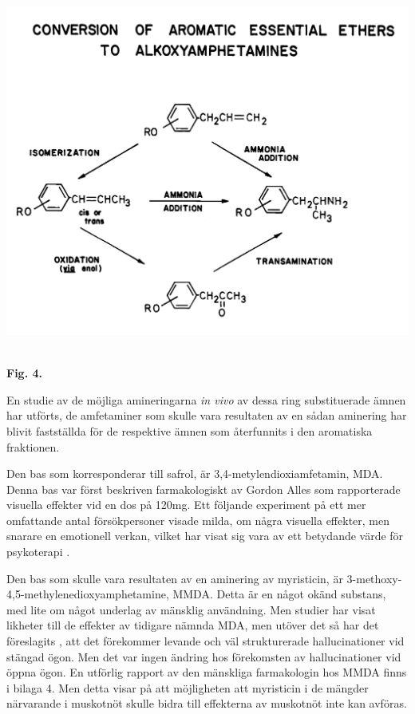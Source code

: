 \documentclass{theme/franska}
\begin{document}
{	\hbox{\hspace{1cm}\includegraphics[scale=0.115]{Figure4}
	}
	\begin{center}\textbf{Fig. 4.}\end{center}


	En studie av de möjliga amineringarna \textit{in vivo} av dessa ring substituerade
	ämnen har utförts, de amfetaminer som skulle vara resultaten av en sådan
	aminering har blivit fastställda för de respektive ämnen som återfunnits
	i den aromatiska fraktionen.

	Den bas som korresponderar till safrol, är 3,4-metylendioxiamfetamin, MDA.
	Denna bas var först beskriven farmakologiskt av Gordon Alles \cite{alles1959some} som
	rapporterade visuella effekter vid en dos på 120mg. Ett följande experiment
	\cite{shulgin1967chemistry} på ett mer omfattande antal försökpersoner visade milda, om några
	visuella effekter, men snarare en emotionell verkan, vilket har visat sig
	vara av ett betydande värde för psykoterapi \cite{shulgin1967chemistry}.

	Den bas som skulle vara resultaten av en aminering av myristicin, är
	3-methoxy-4,5-methylenedioxyamphetamine, MMDA.
	Detta är en något okänd substans, med lite om något underlag av mänsklig användning. Men studier har visat likheter till de effekter av tidigare nämnda MDA, men utöver det så har det föreslagits \cite{shulgin1995pihkal}, att det förekommer levande och väl strukturerade hallucinationer vid stängad ögon. Men det var ingen ändring hos förekomsten av hallucinationer vid öppna ögon. En utförlig rapport av den mänskliga farmakologin hos MMDA finns i bilaga 4.
	Men detta visar på att möjligheten att myristicin i de mängder närvarande i muskotnöt skulle bidra till effekterna av muskotnöt inte kan avföras.

}
\end{document}
